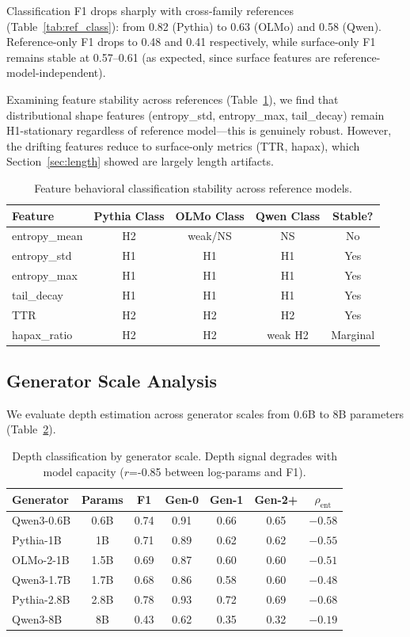 \documentclass[11pt]{article}
\begin{document}
Classification F1 drops sharply with cross-family references (Table~\ref{tab:ref_class}): from 0.82 (Pythia) to 0.63 (OLMo) and 0.58 (Qwen).
Reference-only F1 drops to 0.48 and 0.41 respectively, while surface-only F1 remains stable at 0.57--0.61 (as expected, since surface features are reference-model-independent).

Examining feature stability across references (Table~\ref{tab:stability}), we find that distributional shape features (entropy\_std, entropy\_max, tail\_decay) remain H1-stationary regardless of reference model---this is genuinely robust.
However, the drifting features reduce to surface-only metrics (TTR, hapax), which Section~\ref{sec:length} showed are largely length artifacts.

\begin{table}[h]
\centering
\caption{Feature behavioral classification stability across reference models.}
\label{tab:stability}
\begin{tabular}{lcccc}
\toprule
Feature & Pythia Class & OLMo Class & Qwen Class & Stable? \\
\midrule
entropy\_mean & H2 & weak/NS & NS & No \\
entropy\_std & H1 & H1 & H1 & Yes \\
entropy\_max & H1 & H1 & H1 & Yes \\
tail\_decay & H1 & H1 & H1 & Yes \\
TTR & H2 & H2 & H2 & Yes \\
hapax\_ratio & H2 & H2 & weak H2 & Marginal \\
\bottomrule
\end{tabular}
\end{table}

\subsection{Generator Scale Analysis}
\label{sec:scale}

We evaluate depth estimation across generator scales from 0.6B to 8B parameters (Table~\ref{tab:scale}).

\begin{table}[h]
\centering
\caption{Depth classification by generator scale. Depth signal degrades with model capacity ($r$=-0.85 between log-params and F1).}
\label{tab:scale}
\begin{tabular}{lcccccc}
\toprule
Generator & Params & F1 & Gen-0 & Gen-1 & Gen-2+ & $\rho_{\text{ent}}$ \\
\midrule
Qwen3-0.6B & 0.6B & 0.74 & 0.91 & 0.66 & 0.65 & $-0.58$ \\
Pythia-1B & 1B & 0.71 & 0.89 & 0.62 & 0.62 & $-0.55$ \\
OLMo-2-1B & 1.5B & 0.69 & 0.87 & 0.60 & 0.60 & $-0.51$ \\
Qwen3-1.7B & 1.7B & 0.68 & 0.86 & 0.58 & 0.60 & $-0.48$ \\
Pythia-2.8B & 2.8B & 0.78 & 0.93 & 0.72 & 0.69 & $-0.68$ \\
Qwen3-8B & 8B & 0.43 & 0.62 & 0.35 & 0.32 & $-0.19$ \\
\bottomrule
\end{tabular}
\end{table}
\end{document}
